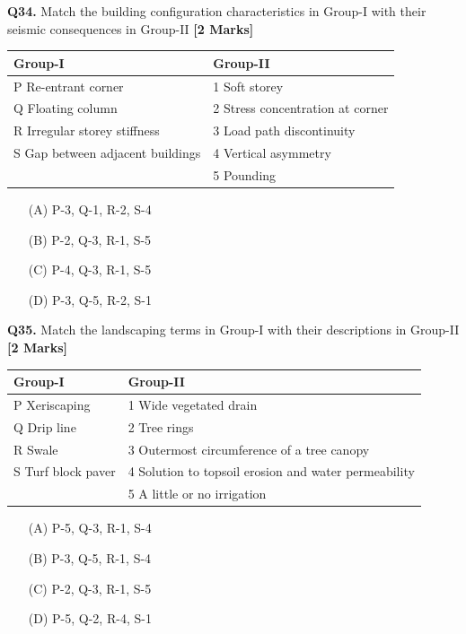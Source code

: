 \documentclass[11pt]{article}
\newcommand{\questionb}[2]{
    \noindent\textbf{Q#2.} #1 \hfill \textbf{[2 Marks]}
}
\begin{document}
\questionb{Match the building configuration characteristics in Group-I with their seismic consequences in Group-II}{34}
\begin{tabularx}{\textwidth}{|l|X|}
\hline
\textbf{Group-I} & \textbf{Group-II} \\
\hline
P Re-entrant corner & 1 Soft storey \\
Q Floating column & 2 Stress concentration at corner \\
R Irregular storey stiffness & 3 Load path discontinuity \\
S Gap between adjacent buildings & 4 Vertical asymmetry \\
 & 5 Pounding \\
\hline
\end{tabularx}
\begin{enumerate}
    \item[(A)] P-3, Q-1, R-2, S-4
    \item[(B)] P-2, Q-3, R-1, S-5
    \item[(C)] P-4, Q-3, R-1, S-5
    \item[(D)] P-3, Q-5, R-2, S-1
\end{enumerate}
\vspace{0.5cm}

\questionb{Match the landscaping terms in Group-I with their descriptions in Group-II}{35}
\begin{tabularx}{\textwidth}{|l|X|}
\hline
\textbf{Group-I} & \textbf{Group-II} \\
\hline
P Xeriscaping & 1 Wide vegetated drain \\
Q Drip line & 2 Tree rings \\
R Swale & 3 Outermost circumference of a tree canopy \\
S Turf block paver & 4 Solution to topsoil erosion and water permeability \\
 & 5 A little or no irrigation \\
\hline
\end{tabularx}
\begin{enumerate}
    \item[(A)] P-5, Q-3, R-1, S-4
    \item[(B)] P-3, Q-5, R-1, S-4
    \item[(C)] P-2, Q-3, R-1, S-5
    \item[(D)] P-5, Q-2, R-4, S-1
\end{enumerate}
\vspace{0.5cm}
\end{document}
